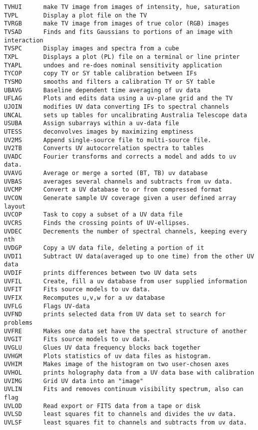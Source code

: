 \begin{verbatim}
TVHUI      make TV image from images of intensity, hue, saturation
TVPL       Display a plot file on the TV
TVRGB      make TV image from images of true color (RGB) images
TVSAD      Finds and fits Gaussians to portions of an image with interaction
TVSPC      Display images and spectra from a cube
TXPL       Displays a plot (PL) file on a terminal or line printer
TYAPL      undoes and re-does nominal sensitivity application
TYCOP      copy TY or SY table calibration between IFs
TYSMO      smooths and filters a calibration TY or SY table
UBAVG      Baseline dependent time averaging of uv data
UFLAG      Plots and edits data using a uv-plane grid and the TV
UJOIN      modifies UV data converting IFs to spectral channels
UNCAL      sets up tables for uncalibrating Australia Telescope data
USUBA      Assign subarrays within a uv-data file
UTESS      deconvolves images by maximizing emptiness
UV2MS      Append single-source file to multi-source file.
UV2TB      Converts UV autocorrelation spectra to tables
UVADC      Fourier transforms and corrects a model and adds to uv data.
UVAVG      Average or merge a sorted (BT, TB) uv database
UVBAS      averages several channels and subtracts from uv data.
UVCMP      Convert a UV database to or from compressed format
UVCON      Generate sample UV coverage given a user defined array layout
UVCOP      Task to copy a subset of a UV data file
UVCRS      Finds the crossing points of UV-ellipses.
UVDEC      Decrements the number of spectral channels, keeping every nth
UVDGP      Copy a UV data file, deleting a portion of it
UVDI1      Subtract UV data(averaged up to one time) from the other UV data
UVDIF      prints differences between two UV data sets
UVFIL      Create, fill a uv database from user supplied information
UVFIT      Fits source models to uv data.
UVFIX      Recomputes u,v,w for a uv database
UVFLG      Flags UV-data
UVFND      prints selected data from UV data set to search for problems
UVFRE      Makes one data set have the spectral structure of another
UVGIT      Fits source models to uv data.
UVGLU      Glues UV data frequency blocks back together
UVHGM      Plots statistics of uv data files as histogram.
UVHIM      Makes image of the histogram on two user-chosen axes
UVHOL      prints holography data from a UV data base with calibration
UVIMG      Grid UV data into an "image"
UVLIN      Fits and removes continuum visibility spectrum, also can flag
UVLOD      Read export or FITS data from a tape or disk
UVLSD      least squares fit to channels and divides the uv data.
UVLSF      least squares fit to channels and subtracts from uv data.

\end{verbatim}
